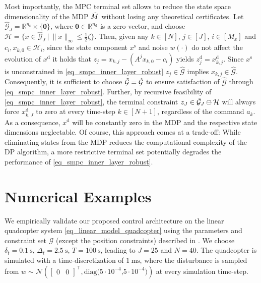 \documentclass{IEEEtran}
\begin{document}
Most importantly, the MPC terminal set allows to reduce the state space dimensionality of the MDP $\Tilde{M}$ without losing any theoretical certificates. 
Let $\hat{\mathcal{G}}_J=\mathbb{R}^{n_{\text{s}}}\times\{ \textbf{0}\}$, where $\textbf{0}\in\mathbb{R}^{n_{\text{d}}}$ is a zero-vector, and choose $\mathcal{H}=\{x\in\hat{\mathcal{G}}_J\ | \ \|x\|_{\infty}\leq \frac{1}{2}\zeta\}$. Then, given any $k\in[N]$, $j\in[J]$, $i\in[M_x]$ and $c_i,x_{k,0}\in\mathcal{H}_i$, since the state component $x^{\text{s}}$ and noise $w(\cdot)$ do not affect the evolution of $x^{\text{d}}$ it holds that $z_j=x_{k,j}-(A^jx_{k,0}-c_i)$ yields $z_j^{\text{d}}=x_{k,j}^{\text{d}}$. Since $x^{\text{s}}$ is unconstrained in \eqref{eq_smpc_inner_layer_robust} $z_{j}\in\hat{\mathcal{G}}$ implies $x_{k,j}\in\hat{\mathcal{G}}$. Consequently, it is sufficient to choose $\Tilde{\mathcal{G}}=\hat{\mathcal{G}}$ to ensure satisfaction of $\hat{\mathcal{G}}$ through \eqref{eq_smpc_inner_layer_robust}. Further, by recursive feasibility of \eqref{eq_smpc_inner_layer_robust}, the terminal constraint $z_J\in\Tilde{\mathcal{G}}_J\ominus\mathcal{H}$ will always force $x^{\text{d}}_{k,J}$ to zero at every time-step $k\in[N+1]$, regardless of the command $a_k$.
As a consequence, $x^{\text{d}}$ will be constantly zero in the MDP and the respective state dimensions neglectable. Of course, this approach comes at a trade-off: While eliminating states from the MDP reduces the computational complexity of the DP algorithm, a more restrictive terminal set potentially degrades the performance of \eqref{eq_smpc_inner_layer_robust}. 

\section{Numerical Examples}
\label{sec_numerical_example}
We empirically validate our proposed control architecture on the linear quadcopter system \eqref{eq_linear_model_quadcopter} using the parameters and constraint set $\mathcal{G}$ (except the position constraints) described in \cite{schmid2022real}. We choose $\delta_t = \SI{0.1}{\second}$, $\Delta_t=\SI{2.5}{\second}$, $T=\SI{100}{\second}$, leading to $J=25$ and $N=40$. The quadcopter is simulated with a time-discretization of $\SI{1}{\milli\second}$, where the disturbance is sampled from $w\sim\mathcal{N}(\begin{bmatrix}
    0 & 0
\end{bmatrix}^{\top},\text{diag($5\cdot10^{-4}$,$5\cdot10^{-4}$)})$ at every simulation time-step. 
\end{document}
